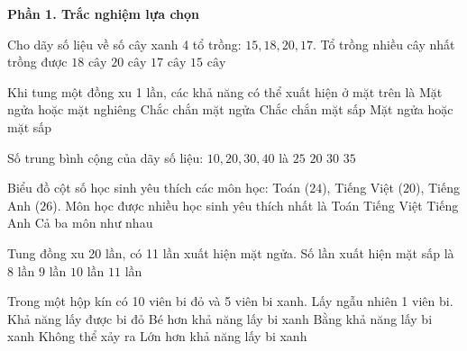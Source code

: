 \textbf{Phần 1. Trắc nghiệm lựa chọn}

\begin{ex} %
Cho dãy số liệu về số cây xanh 4 tổ trồng: $15, 18, 20, 17$. Tổ trồng nhiều cây nhất trồng được
\choice
{$18\text{ cây}$}
{\True $20\text{ cây}$}
{$17\text{ cây}$}
{$15\text{ cây}$}
\end{ex}

\begin{ex} %
Khi tung một đồng xu 1 lần, các khả năng có thể xuất hiện ở mặt trên là
\choice
{Mặt ngửa hoặc mặt nghiêng}
{Chắc chắn mặt ngửa}
{Chắc chắn mặt sấp}
{\True Mặt ngửa hoặc mặt sấp}
\end{ex}

\begin{ex} %
Số trung bình cộng của dãy số liệu: $10, 20, 30, 40$ là
\choice
{\True $25$}
{$20$}
{$30$}
{$35$}
\end{ex}

\begin{ex} %
Biểu đồ cột số học sinh yêu thích các môn học: Toán ($24$), Tiếng Việt ($20$), Tiếng Anh ($26$). Môn học được nhiều học sinh yêu thích nhất là
\choice
{Toán}
{Tiếng Việt}
{\True Tiếng Anh}
{Cả ba môn như nhau}
\end{ex}

\begin{ex} %
Tung đồng xu 20 lần, có 11 lần xuất hiện mặt ngửa. Số lần xuất hiện mặt sấp là
\choice
{$8$ lần}
{\True $9$ lần}
{$10$ lần}
{$11$ lần}
\end{ex}

\begin{ex} %
Trong một hộp kín có 10 viên bi đỏ và 5 viên bi xanh. Lấy ngẫu nhiên 1 viên bi. Khả năng lấy được bi đỏ
\choice
{Bé hơn khả năng lấy bi xanh}
{Bằng khả năng lấy bi xanh}
{Không thể xảy ra}
{\True Lớn hơn khả năng lấy bi xanh}
\end{ex}

